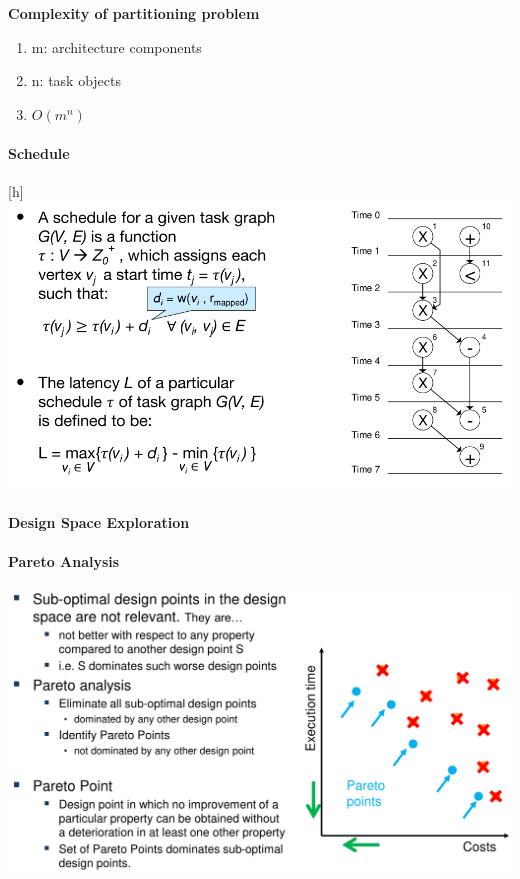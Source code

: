 \documentclass[english]{latex4ei/latex4ei_sheet}
\begin{document}
\textbf{Complexity of partitioning problem}
\begin{enumerate}
	\item m: architecture components
	\item n: task objects
	\item $O(m^n)$
\end{enumerate}

\paragraph{Schedule}

\begin{center}[h]
  \includegraphics[width=\linewidth]{assets/Schedule.png}
  \label{fig:schedule}
\end{center}

\paragraph{Design Space Exploration}

\paragraph{Pareto Analysis}

\begin{center}
  \centering
  \includegraphics[width=\linewidth]{assets/ParetoSlide.png}
  \label{fig:paretoslide}
\end{center}
\end{document}
